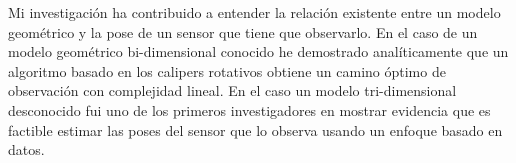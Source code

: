Mi investigación ha contribuido a entender la relación existente entre un modelo geométrico y la pose de un sensor que tiene que observarlo. En el caso de un modelo geométrico bi-dimensional conocido he demostrado analíticamente que un algoritmo basado en los calipers rotativos obtiene un camino óptimo de observación con complejidad lineal. En el caso un modelo tri-dimensional desconocido fui uno de los primeros investigadores en mostrar evidencia que es factible estimar las poses del sensor que lo observa usando un enfoque basado en datos.